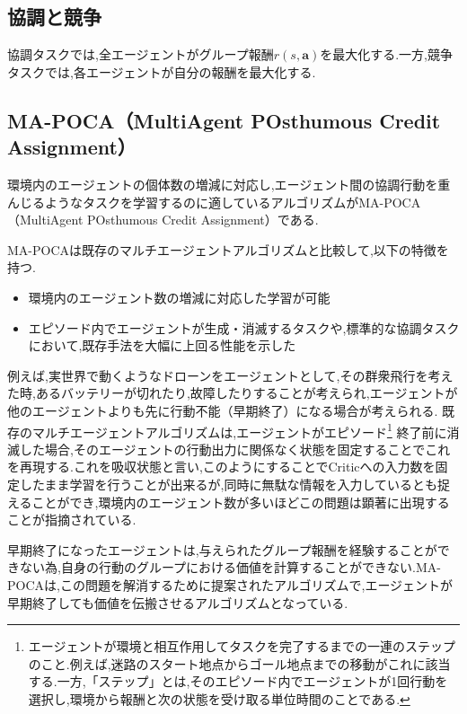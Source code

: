 \subsection*{協調と競争}
協調タスクでは,全エージェントがグループ報酬$r(s, \boldsymbol{a})$を最大化する.一方,競争タスクでは,各エージェントが自分の報酬を最大化する.

\subsection{MA-POCA（MultiAgent POsthumous Credit Assignment）}
  環境内のエージェントの個体数の増減に対応し,エージェント間の協調行動を重んじるようなタスクを学習するのに適しているアルゴリズムがMA-POCA（MultiAgent POsthumous Credit Assignment）\cite{mapoca}である.\par 
  MA-POCAは既存のマルチエージェントアルゴリズムと比較して,以下の特徴を持つ.
  \begin{itemize}
    \item 環境内のエージェント数の増減に対応した学習が可能
    \item エピソード内でエージェントが生成・消滅するタスクや,標準的な協調タスクにおいて,既存手法を大幅に上回る性能を示した
  \end{itemize}
  例えば,実世界で動くようなドローンをエージェントとして,その群衆飛行を考えた時,あるバッテリーが切れたり,故障したりすることが考えられ,エージェントが他のエージェントよりも先に行動不能（早期終了）になる場合が考えられる.
  既存のマルチエージェントアルゴリズムは,エージェントがエピソード\footnote{エージェントが環境と相互作用してタスクを完了するまでの一連のステップのこと.例えば,迷路のスタート地点からゴール地点までの移動がこれに該当する.一方,「ステップ」とは,そのエピソード内でエージェントが1回行動を選択し,環境から報酬と次の状態を受け取る単位時間のことである.}
  終了前に消滅した場合,そのエージェントの行動出力に関係なく状態を固定することでこれを再現する.これを吸収状態と言い,このようにすることでCriticへの入力数を固定したまま学習を行うことが出来るが,同時に無駄な情報を入力しているとも捉えることができ,環境内のエージェント数が多いほどこの問題は顕著に出現することが指摘されている.\par
  早期終了になったエージェントは,与えられたグループ報酬を経験することができない為,自身の行動のグループにおける価値を計算することができない.MA-POCAは,この問題を解消するために提案されたアルゴリズムで,エージェントが早期終了しても価値を伝搬させるアルゴリズムとなっている.\par
